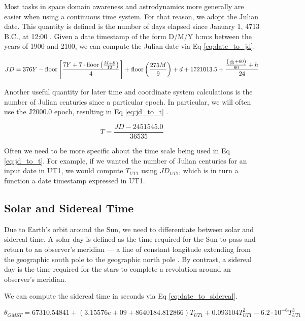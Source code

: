 Most tasks in space domain awareness and astrodynamics more generally are easier when using a continuous time system. For that reason, we adopt the Julian date. This quantity is defined is the number of days elapsed since January 1, 4713 B.C., at 12:00 \cite{vallado4ed}. Given a date timestamp of the form D/M/Y h:m:s between the years of 1900 and 2100, we can compute the Julian date via Eq \ref{eq:date_to_jd}.

\begin{equation} \label{eq:date_to_jd}
  JD = 376Y - \operatorname{floor}{\left[ \frac{7Y + 7 \cdot \operatorname{floor}{\left(\frac{M + 9}{12} \right)}}{4} \right]}
      + \operatorname{floor}{\left(\frac{275M}{9}\right)} 
      + d
      + 1721013.5
      + \frac{\frac{\left(\frac{s}{60} + 60\right)}{60} + h}{24}
\end{equation}

Another useful quantity for later time and coordinate system calculations is the number of Julian centuries since a particular epoch. In particular, we will often use the J2000.0 epoch, resulting in Eq \ref{eq:jd_to_t} \cite{vallado4ed}.

\begin{equation} \label{eq:jd_to_t}
  T = \frac{JD - 2451545.0}{36535}
\end{equation}

Often we need to be more specific about the time scale being used in Eq \ref{eq:jd_to_t}. For example, if we wanted the number of Julian centuries for an input date in UT1, we would compute $T_{UT1}$ using $JD_{UT1}$, which is in turn a function a date timestamp expressed in UT1. 

\subsection{Solar and Sidereal Time}

Due to Earth's orbit around the Sun, we need to differentiate between solar and sidereal time. A solar day is defined as the time required for the Sun to pass and return to an observer's meridian --- a line of constant longitude extending from the geographic south pole to the geographic north pole \cite{vallado4ed}. By contrast, a sidereal day is the time required for the stars to complete a revolution around an observer's meridian. 

We can compute the sidereal time in seconds via Eq \ref{eq:date_to_sidereal}.

\begin{equation} \label{eq:date_to_sidereal}
  \theta_{GMST} = 67310.54841
        + (3.15576e+09 + 8640184.812866) T_{UT1}
        + 0.093104 T_{UT1}^2
        - 6.2 \cdot 10^{-6} T_{UT1}^3
\end{equation}

